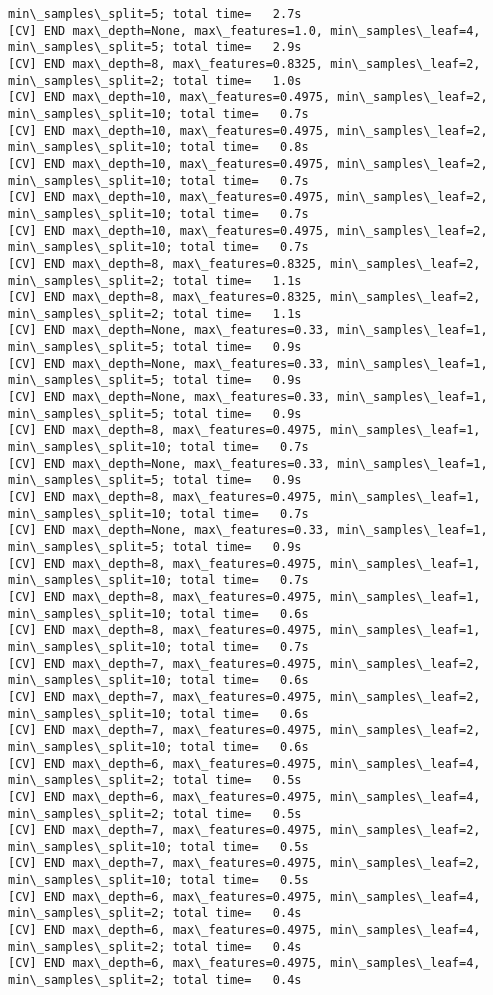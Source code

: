 \documentclass[11pt]{article}
\begin{document}
\begin{Verbatim}[commandchars=\\\{\}]
min\_samples\_split=5; total time=   2.7s
[CV] END max\_depth=None, max\_features=1.0, min\_samples\_leaf=4,
min\_samples\_split=5; total time=   2.9s
[CV] END max\_depth=8, max\_features=0.8325, min\_samples\_leaf=2,
min\_samples\_split=2; total time=   1.0s
[CV] END max\_depth=10, max\_features=0.4975, min\_samples\_leaf=2,
min\_samples\_split=10; total time=   0.7s
[CV] END max\_depth=10, max\_features=0.4975, min\_samples\_leaf=2,
min\_samples\_split=10; total time=   0.8s
[CV] END max\_depth=10, max\_features=0.4975, min\_samples\_leaf=2,
min\_samples\_split=10; total time=   0.7s
[CV] END max\_depth=10, max\_features=0.4975, min\_samples\_leaf=2,
min\_samples\_split=10; total time=   0.7s
[CV] END max\_depth=10, max\_features=0.4975, min\_samples\_leaf=2,
min\_samples\_split=10; total time=   0.7s
[CV] END max\_depth=8, max\_features=0.8325, min\_samples\_leaf=2,
min\_samples\_split=2; total time=   1.1s
[CV] END max\_depth=8, max\_features=0.8325, min\_samples\_leaf=2,
min\_samples\_split=2; total time=   1.1s
[CV] END max\_depth=None, max\_features=0.33, min\_samples\_leaf=1,
min\_samples\_split=5; total time=   0.9s
[CV] END max\_depth=None, max\_features=0.33, min\_samples\_leaf=1,
min\_samples\_split=5; total time=   0.9s
[CV] END max\_depth=None, max\_features=0.33, min\_samples\_leaf=1,
min\_samples\_split=5; total time=   0.9s
[CV] END max\_depth=8, max\_features=0.4975, min\_samples\_leaf=1,
min\_samples\_split=10; total time=   0.7s
[CV] END max\_depth=None, max\_features=0.33, min\_samples\_leaf=1,
min\_samples\_split=5; total time=   0.9s
[CV] END max\_depth=8, max\_features=0.4975, min\_samples\_leaf=1,
min\_samples\_split=10; total time=   0.7s
[CV] END max\_depth=None, max\_features=0.33, min\_samples\_leaf=1,
min\_samples\_split=5; total time=   0.9s
[CV] END max\_depth=8, max\_features=0.4975, min\_samples\_leaf=1,
min\_samples\_split=10; total time=   0.7s
[CV] END max\_depth=8, max\_features=0.4975, min\_samples\_leaf=1,
min\_samples\_split=10; total time=   0.6s
[CV] END max\_depth=8, max\_features=0.4975, min\_samples\_leaf=1,
min\_samples\_split=10; total time=   0.7s
[CV] END max\_depth=7, max\_features=0.4975, min\_samples\_leaf=2,
min\_samples\_split=10; total time=   0.6s
[CV] END max\_depth=7, max\_features=0.4975, min\_samples\_leaf=2,
min\_samples\_split=10; total time=   0.6s
[CV] END max\_depth=7, max\_features=0.4975, min\_samples\_leaf=2,
min\_samples\_split=10; total time=   0.6s
[CV] END max\_depth=6, max\_features=0.4975, min\_samples\_leaf=4,
min\_samples\_split=2; total time=   0.5s
[CV] END max\_depth=6, max\_features=0.4975, min\_samples\_leaf=4,
min\_samples\_split=2; total time=   0.5s
[CV] END max\_depth=7, max\_features=0.4975, min\_samples\_leaf=2,
min\_samples\_split=10; total time=   0.5s
[CV] END max\_depth=7, max\_features=0.4975, min\_samples\_leaf=2,
min\_samples\_split=10; total time=   0.5s
[CV] END max\_depth=6, max\_features=0.4975, min\_samples\_leaf=4,
min\_samples\_split=2; total time=   0.4s
[CV] END max\_depth=6, max\_features=0.4975, min\_samples\_leaf=4,
min\_samples\_split=2; total time=   0.4s
[CV] END max\_depth=6, max\_features=0.4975, min\_samples\_leaf=4,
min\_samples\_split=2; total time=   0.4s
    \end{Verbatim}
\end{document}
